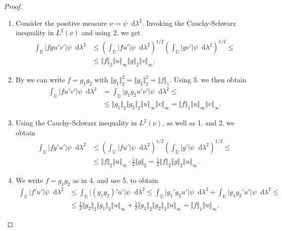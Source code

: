 \documentclass[letterpaper, 11pt]{article}
\newcommand{\D}{\mathbb{D}}
\newcommand{\1}{\mathds{1}}
\newcommand{\dd}{\mathop{}\!\mathrm{d}}
\theoremstyle{definition}
\begin{document}
\begin{proof} {\ }
\begin{enumerate}
    \item Consider the positive measure $\nu \coloneqq \psi \dd \lambda^2$. Invoking the Cauchy-Schwarz inequality in $L^2(\nu)$ and using 2. we get
    \begin{align*}
      \int_\D \vert f g u' v' \vert \psi \dd \lambda^2 &\leq \left( \int_\D \vert f u' \vert \psi \dd \lambda^2 \right)^{1/2} \left( \int_\D \vert g v' \vert \psi \dd \lambda^2 \right)^{1/2} \leq \\
      &\leq \Vert f \Vert_2 \Vert u \Vert_\infty \Vert g \Vert_2 \Vert v \Vert_\infty.
    \end{align*}

    \item By  we can write $f = g_1 g_2$ with $\Vert g_1 \Vert_2^2 = \Vert g_2 \Vert_2^2 = \Vert f \Vert_1$. Using 3. we then obtain
    \begin{align*}
      \int_\D \vert f u' v' \vert \psi \dd \lambda^2 &= \int_\D \vert g_1 g_2 u' v' \vert \psi \dd \lambda^2 \leq \\
      &\leq \Vert g_1 \Vert_2 \Vert g_2 \Vert_2 \Vert u \Vert_\infty \Vert v \Vert_\infty = \Vert f \Vert_1 \Vert u \Vert_\infty \Vert v \Vert_\infty.
    \end{align*}

    \item Using the Cauchy-Schwarz inequality in $L^2(\nu)$, as well as 1. and 2. we obtain
    \begin{align*}
      \displaystyle \int_\D \vert f g' u' \vert \psi \dd \lambda^2 &\leq \left( \int_\D \vert f u' \vert \psi \dd \lambda^2 \right)^{1/2} \left( \int_\D \vert g' \vert \psi \dd \lambda^2 \right)^{1/2} \leq \\
      &\leq \Vert f \Vert_2 \Vert u \Vert_\infty \cdot \frac{1}{2} \Vert g \Vert_2 = \frac{1}{2} \Vert f \Vert_2 \Vert g \Vert_2 \Vert u \Vert_\infty.
    \end{align*}

    \item We write $f = g_1 g_2$ as in 4. and use 5. to obtain
    \begin{align*}
      \int_\D \vert f' u' \vert \psi \dd \lambda^2 &\leq \int_\D \vert (g_1 g_2)' u' \vert \psi \dd \lambda^2 \leq \int_\D \vert g_1' g_2 u' \vert \psi \dd \lambda^2 + \int_\D \vert g_1 g_2' u' \vert \psi \dd \lambda^2 \leq \\
      &\leq \frac{1}{2} \Vert g_2 \Vert_2 \Vert g_1 \Vert_2 \Vert u \Vert_\infty + \frac{1}{2} \Vert g_1 \Vert_2 \Vert g_2 \Vert_2 \Vert u \Vert_\infty = \Vert f \Vert_1 \Vert u \Vert_\infty.
    \end{align*}
  \end{enumerate}
\end{proof}
\end{document}

